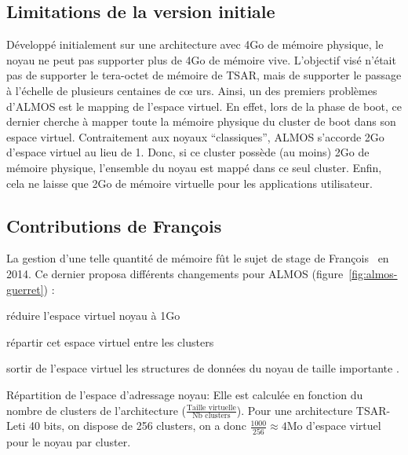     \subsection{Limitations de la version initiale}

      Développé initialement sur une architecture avec 4Go de mémoire physique,
      le noyau ne peut pas supporter plus de 4Go de mémoire vive. L'objectif
      visé n'était pas de supporter le tera-octet de mémoire de TSAR, mais de
      supporter le passage à l'échelle de plusieurs centaines de c\oe
      urs. Ainsi, un des premiers problèmes d'ALMOS est le mapping de l'espace
      virtuel. En effet, lors de la phase de boot, ce dernier cherche à mapper
      toute la mémoire physique du cluster de boot dans son espace
      virtuel. Contraitement aux noyaux ``classiques'', ALMOS s'accorde 2Go
      d'espace virtuel au lieu de 1. Donc, si ce cluster possède (au moins) 2Go
      de mémoire physique, l'ensemble du noyau est mappé dans ce seul
      cluster. Enfin, cela ne laisse que 2Go de mémoire virtuelle pour les
      applications utilisateur.


    \subsection{Contributions de François \citeauthor{guerret2014exploitation}}

      La gestion d'une telle quantité de mémoire fût le sujet de stage de
      François~\citet{guerret2014exploitation} en 2014. Ce dernier proposa
      différents changements pour ALMOS (figure~\ref{fig:almos-guerret}) :
      \benumline \item réduire l'espace virtuel noyau à 1Go \item répartir cet
      espace virtuel entre les clusters \item sortir de l'espace virtuel les
      structures de données du noyau de taille importante \eenumline.

      \begin{paragraph}{Répartition de l'espace d'adressage noyau:}
        Elle est calculée en fonction du nombre de clusters de l'architecture
        ($\frac{\text{Taille virtuelle}}{\text{Nb clusters}}$). Pour une
        architecture TSAR-Leti 40 bits, on dispose de 256 clusters, on a donc
        $\frac{1000}{256}\approx4$Mo d'espace virtuel pour le noyau par cluster.
      \end{paragraph}


